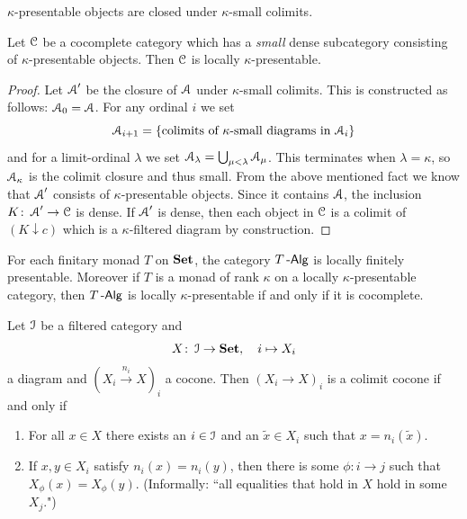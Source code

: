 \documentclass[a4paper,11pt,oneside,openany]{scrbook}
\begin{document}
\begin{center}
	$\kappa$-presentable objects are closed under $\kappa$-small colimits.
\end{center}
\begin{prop}
	Let $\operatorname{\mathcal{C}}$ be a cocomplete category which has a \emph{small} dense subcategory consisting of $\kappa$-presentable objects. Then $\operatorname{\mathcal{C}}$ is locally $\kappa$-presentable.
\end{prop}
\begin{proof}
	Let $\operatorname{\mathcal{A}}'$ be the closure of $\operatorname{\mathcal{A}} $ under $ \kappa $-small  colimits.
	This is constructed as follows: $\operatorname{\mathcal{A}}_0 =\operatorname{\mathcal{A}} $.
	For any ordinal $ i $ we set
	\begin{displaymath}
		\operatorname{\mathcal{A}}_{i+1} = \{\text{colimits of $ \kappa $-small diagrams in $\operatorname{\mathcal{A}}_i $\}}
	\end{displaymath}
	and for a limit-ordinal $ \lambda $ we set $\operatorname{\mathcal{A}}_\lambda = \bigcup_{\mu<\lambda}\operatorname{\mathcal{A}}_{\mu} $.
	This terminates when $ \lambda = \kappa $, so $\operatorname{\mathcal{A}}_\kappa $ is the colimit closure and thus small.
	From the above mentioned fact we know that $\operatorname{\mathcal{A}}'  $ consists of $ \kappa $-presentable objects.
	Since it contains $\operatorname{\mathcal{A}} $, the inclusion $ K \colon\operatorname{\mathcal{A}}' \to \operatorname{\mathcal{C}} $ is dense.
	If $\operatorname{\mathcal{A}}' $ is dense, then each object in $ \operatorname{\mathcal{C}} $ is a colimit of $(K\downarrow c)$ which is a $ \kappa $-filtered diagram by construction.
\end{proof}
\begin{cor}
	For each finitary monad $ T $ on $ {\normalfont\textbf{Set}} $, the category $ T\operatorname{-\mathsf{Alg}} $ is locally finitely presentable.
	Moreover if $ T $ is a monad of rank $ \kappa $ on a locally $ \kappa $-presentable category, then $ T\operatorname{-\mathsf{Alg}} $ is locally $ \kappa $-presentable if and only if it is cocomplete.
\end{cor}
\begin{thm}
	Let $ \operatorname{\mathcal{I}} $ be a filtered category and
	\begin{displaymath}
		X \colon \operatorname{\mathcal{I}} \to{\normalfont\textbf{Set}},\quad i \mapsto X_i
	\end{displaymath}
	a diagram and $ (X_i \xrightarrow{n_i} X)_i $ a cocone.
	Then $ (X_i \to X)_i $ is a colimit cocone if and only if
	\begin{enumerate}[label=\roman*)]
		\item For all $ x \in X $ there exists an $ i\in\operatorname{\mathcal{I}} $ and an $ \tilde x \in X_i $ such that $ x = n_i (\tilde x) $.
		\item If $ x , y \in X_i $ satisfy $ n_i(x) = n_i(y) $, then there is some $ \phi \colon i\to j $ such that $ X_\phi(x) = X_\phi(y) $.
		      (Informally: ``all equalities that hold in $ X $ hold in some $ X_j $.")
	\end{enumerate}
\end{thm}
\end{document}
